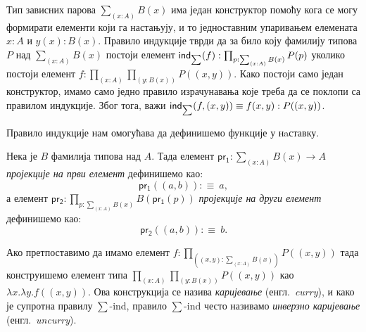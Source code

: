 \documentclass[12pt,oneside]{memoir}
\begin{document}
Тип зависних парова $\sum_{(x:A)} B (x)$ има један конструктор помоћу кога се могу формирати елементи који га настањују, и то једноставним упаривањем елемената $x : A$ и $y(x) : B(x)$. Правило индукције тврди да за било коју фамилију типова $P$ над $\sum_{(x : A)} B (x)$ постоји елемент $\mathsf{ind}_{\sum}(f) : \prod_{p : \sum_{(x : A)} B(x)} P (p)$ уколико постоји елемент $f : \prod_{(x : A)} \prod_{(y : B(x))} P ((x, y))$. Како постоји само један конструктор, имамо само једно правило израчунавања које треба да се поклопи са правилом индукције. Због тога, важи $\mathsf{ind}_{\sum}(f, (x, y)) \equiv f(x, y) : P((x, y))$.

Правило индукције нам омогућава да дефинишемо функције у нaставку.

\begin{definition} 
\label{def:proj}
    Нека је $B$ фамилија типова над $A$. Тада елемент $\mathsf{pr_1} : \sum_{(x : A)} B(x) \to A$ \emph{пројекције на први елемент} дефинишемо као: 
    \begin{equation}
        \mathsf{pr_1} ((a, b)):\equiv~a,
    \end{equation}
    а елемент $\mathsf{pr_2} : \prod_{p : \sum_{(x : A)} B(x)} B(\mathsf{pr_1}(p))$ \emph{пројекције на други елемент} дефинишемо као:
    \begin{equation}
        \mathsf{pr_2} ((a, b)):\equiv~b.
    \end{equation}
\end{definition}

Ако претпоставимо да имамо елемент $f : \prod_{((x, y) : \sum_{(x : A)} B(x))} P((x, y))$ тада конструишемо елемент типа $\prod_{(x : A)} \prod_{(y : B(x))} P((x, y))$ као $\lambda  x.\lambda y.f((x, y))$. Ова конструкција се назива \emph{каријевање} (енгл.~\emph{curry}), и како је супротна правилу $\sum$-ind, правило $\sum$-ind често називамо \emph{инверзно каријевање} (енгл.~\emph{uncurry}).
\end{document}
